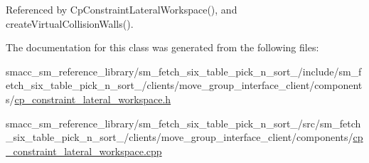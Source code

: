 Referenced by Cp\+Constraint\+Lateral\+Workspace(), and create\+Virtual\+Collision\+Walls().



The documentation for this class was generated from the following files\+:\begin{DoxyCompactItemize}
\item 
smacc\+\_\+sm\+\_\+reference\+\_\+library/sm\+\_\+fetch\+\_\+six\+\_\+table\+\_\+pick\+\_\+n\+\_\+sort\+\_/include/sm\+\_\+fetch\+\_\+six\+\_\+table\+\_\+pick\+\_\+n\+\_\+sort\+\_/clients/move\+\_\+group\+\_\+interface\+\_\+client/components/\hyperlink{cp__constraint__lateral__workspace_8h}{cp\+\_\+constraint\+\_\+lateral\+\_\+workspace.\+h}\item 
smacc\+\_\+sm\+\_\+reference\+\_\+library/sm\+\_\+fetch\+\_\+six\+\_\+table\+\_\+pick\+\_\+n\+\_\+sort\+\_/src/sm\+\_\+fetch\+\_\+six\+\_\+table\+\_\+pick\+\_\+n\+\_\+sort\+\_/clients/move\+\_\+group\+\_\+interface\+\_\+client/components/\hyperlink{cp__constraint__lateral__workspace_8cpp}{cp\+\_\+constraint\+\_\+lateral\+\_\+workspace.\+cpp}\end{DoxyCompactItemize}
